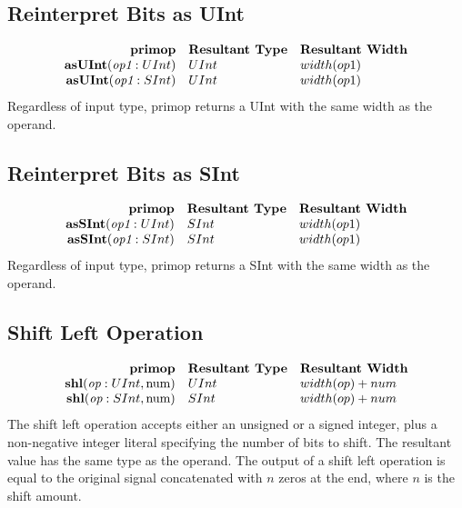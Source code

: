 \documentclass[10pt]{article}
\begin{document}
\subsection{Reinterpret Bits as UInt}
\[
\begin{array}{rll}
\text{\bf primop} & \text{\bf Resultant Type} & \text{\bf Resultant Width} \\
\text{\bf asUInt}(\text{\em op1}:UInt)       & UInt & width(op1) \\
\text{\bf asUInt}(\text{\em op1}:SInt)       & UInt & width(op1) \\
\end{array}
\]
Regardless of input type, primop returns a UInt with the same width as the operand.

\subsection{Reinterpret Bits as SInt}
\[
\begin{array}{rll}
\text{\bf primop} & \text{\bf Resultant Type} & \text{\bf Resultant Width} \\
\text{\bf asSInt}(\text{\em op1}:UInt)     & SInt & width(op1) \\
\text{\bf asSInt}(\text{\em op1}:SInt)     & SInt & width(op1) \\
\end{array}
\]
Regardless of input type, primop returns a SInt with the same width as the operand.

\subsection{Shift Left Operation}
\[
\begin{array}{rll}
\text{\bf primop} & \text{\bf Resultant Type} & \text{\bf Resultant Width} \\
\text{\bf shl}(\text{\em op}:UInt, \text{num})      & UInt & width(op) + num \\
\text{\bf shl}(\text{\em op}:SInt, \text{num})      & SInt & width(op) + num \\
\end{array}
\]
The shift left operation accepts either an unsigned or a signed integer, plus a non-negative integer literal specifying the number of bits to shift.
The resultant value has the same type as the operand.
The output of a shift left operation is equal to the original signal concatenated with $n$ zeros at the end, where $n$ is the shift amount.
\end{document}
